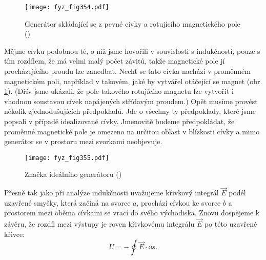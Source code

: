 {  \begin{figure}[ht!] %
    \centering
    \texttt{[image: fyz\_fig354.pdf]}
    \caption{Generátor skládající se z pevné cívky a rotujícího magnetického pole
             (\cite[s.~395]{Feynman02})}
    \label{fyz:fig354}
  \end{figure}
  
  Mějme cívku podobnou té, o níž jsme hovořili v souvislosti s indukčností, pouze s tím rozdílem, 
  že má velmi malý počet závitů, takže magnetické pole jí procházejícího proudu lze zanedbat. Nechť 
  se tato cívka nachází v proměnném magnetickém poli, například v takovém, jaké by vytvářel 
  otáčející se magnet (obr. \ref{fyz:fig354}). (Dřív jsme ukázali, že pole takového rotujícího 
  magnetu lze vytvořit i vhodnou soustavou cívek napájených střídavým proudem.) Opět musíme provést 
  několik zjednodušujících předpokladů. Jde o všechny ty předpoklady, které jsme popsali v případě 
  idealizované cívky. Jmenovitě budeme předpokládat, že proměnné magnetické pole je omezeno na 
  určitou oblast v blízkosti cívky a mimo generátor se v prostoru mezi svorkami neobjevuje.

  \begin{figure}[ht!] %
    \centering
    \texttt{[image: fyz\_fig355.pdf]}
    \caption{Značka ideálního generátoru
             (\cite[s.~396]{Feynman02})}
    \label{fyz:fig355}
  \end{figure}
  
  Přesně tak jako při analýze indukčnosti uvažujeme křivkový integrál \(\vec{E}\) podél uzavřené 
  smyčky, která začíná na svorce \(a\), prochází cívkou ke svorce \(b\) a prostorem mezi oběma 
  cívkami se vrací do svého východiska. Znovu dospějeme k závěru, že rozdíl mezi výstupy je roven 
  křivkovému integrálu \(\vec{E}\) po této uzavřené křivce:
  \begin{equation}\label{fyz:eq478}
   U = -\oint\vec{E}\cdot\dd{s}.
  \end{equation}

}

